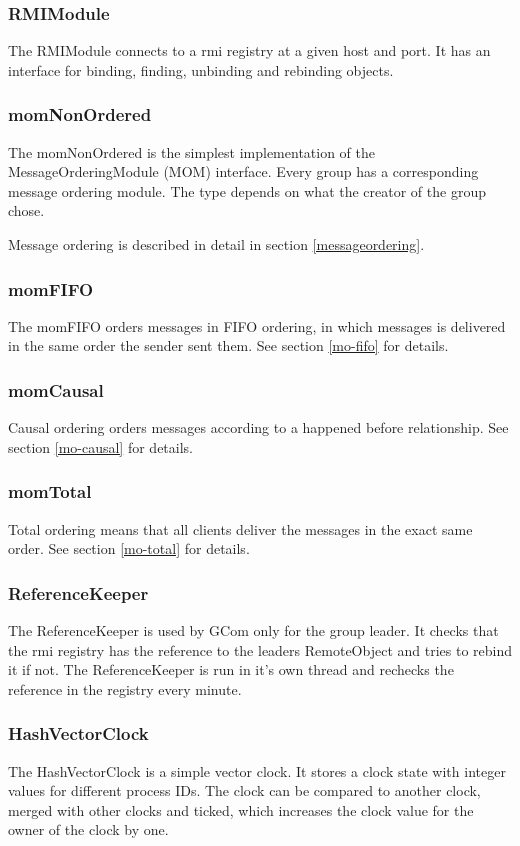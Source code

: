 \documentclass[english]{article}
\begin{document}
\subsubsection{RMIModule}
The RMIModule connects to a rmi registry at a given host and port. It has an interface for binding, finding, unbinding and rebinding objects.

\subsubsection{momNonOrdered}
The momNonOrdered is the simplest implementation of the MessageOrderingModule (MOM) interface. Every group has a corresponding message ordering module. The type depends on what the creator of the group chose. 

Message ordering is described in detail in section \vref{messageordering}.

\subsubsection{momFIFO}
The momFIFO orders messages in FIFO ordering, in which messages is delivered in the same order the sender sent them. See section \vref{mo-fifo} for details.

\subsubsection{momCausal}
Causal ordering orders messages according to a happened before relationship. See section \vref{mo-causal} for details.

\subsubsection{momTotal}
Total ordering means that all clients deliver the messages in the exact same order. See section \vref{mo-total} for details.

\subsubsection{ReferenceKeeper}
The ReferenceKeeper is used by GCom only for the group leader. It checks that the rmi registry has the reference to the leaders RemoteObject and tries to rebind it if not. The ReferenceKeeper is run in it's own thread and rechecks the reference in the registry every minute.

\subsubsection{HashVectorClock}
The HashVectorClock is a simple vector clock. It stores a clock state with integer values for different process IDs. The clock can be compared to another clock, merged with other clocks and ticked, which increases the clock value for the owner of the clock by one.
\end{document}
